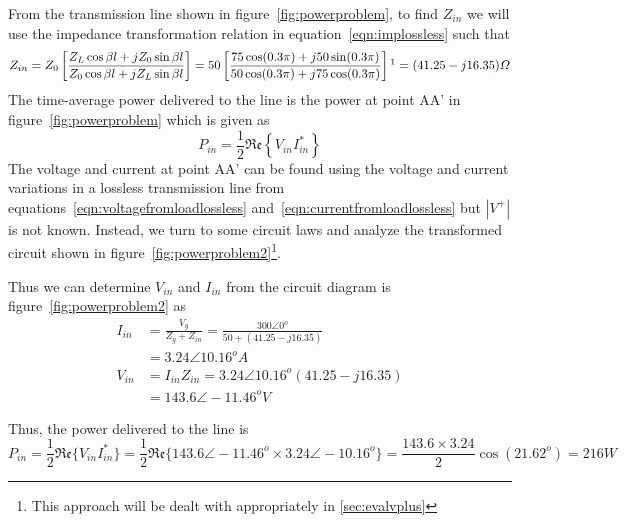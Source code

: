 \begin{exmp}
From the transmission line shown in figure~\ref{fig:powerproblem}, to find $Z_{in}$ we will use the impedance transformation relation in equation~\eqref{eqn:implossless} such that
\begin{dmath*}
Z_{in} = Z_0\left[\frac{Z_L\cos\beta l + jZ_0\sin\beta l}{Z_0\cos\beta l + jZ_L\sin\beta l} \right]
= 50\left[\frac{75\cos(0.3\pi) + j50\sin(0.3\pi)}{50\cos(0.3\pi) + j75\cos(0.3\pi)} \right]\footnotemark
= (41.25 - j16.35)\varOmega
\end{dmath*}
The time-average power delivered to the line is the power at point AA' in figure~\ref{fig:powerproblem} which is given as
\begin{dmath*}
P_{in} = \frac{1}{2}\mathfrak{Re}\left\lbrace V_{in}I_{in}^*\right\rbrace
\end{dmath*}
The voltage and current at point AA' can be found using the voltage and current variations in a lossless transmission line from equations~\eqref{eqn:voltagefromloadlossless} and~\eqref{eqn:currentfromloadlossless} but $|V^+|$ is not known. Instead, we turn to some circuit laws and analyze the transformed circuit shown in figure~\ref{fig:powerproblem2}\footnote{This approach will be dealt with appropriately in \autoref{sec:evalvplus}}.

Thus we can determine $V_{in}$ and $I_{in}$ from the circuit diagram is figure~\ref{fig:powerproblem2} as
\begin{align*}
I_{in} &= \frac{V_g}{Z_g + Z_{in}} 
= \frac{300\angle0^o}{50 + (41.25 - j16.35)}\\
&= 3.24\angle10.16^oA\\
V_{in} &= I_{in}Z_{in} = 3.24\angle10.16^o(41.25 - j16.35)\\
&= 143.6\angle-11.46^oV
\end{align*}

Thus, the power delivered to the line is
\begin{dmath*}
P_{in} = \frac{1}{2}\mathfrak{Re}\lbrace V_{in}I_{in}^\ast\rbrace
= \frac{1}{2}\mathfrak{Re}\lbrace 143.6\angle-11.46^o\times3.24\angle-10.16^o\rbrace
=\frac{143.6\times3.24}{2}\cos(21.62^o)
= 216W
\end{dmath*}


\end{exmp}
